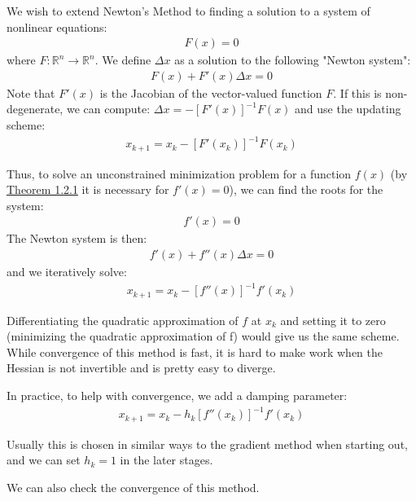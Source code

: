 \documentclass[12pt,a4paper]{article}
\begin{document}
	We wish to extend Newton's Method to finding a solution to a system of nonlinear equations:
	\begin{align*}
		F(x) = 0
	\end{align*}
	where $F: \mathbb{R}^n \rightarrow \mathbb{R}^n$. We define $\Delta x$ as a solution to the following "Newton system":
	\begin{align*}
		F(x) + F'(x)\Delta x = 0
	\end{align*}
	Note that $F'(x)$ is the Jacobian of the vector-valued function $F$. If this is non-degenerate, we can compute: $\Delta x = -[F'(x)]^{-1}F(x)$ and use the updating scheme:
	\begin{align*}
		x_{k+1} = x_k - [F'(x_k)]^{-1}F(x_k)
	\end{align*}
	
	Thus, to solve an unconstrained minimization problem for a function $f(x)$ (by \hyperref[thm121]{Theorem 1.2.1} it is necessary for $f'(x) = 0$), we can find the roots for the system:
	\begin{align*}
		f'(x) = 0
	\end{align*}
	The Newton system is then:
	\begin{align*}
		f'(x) + f''(x)\Delta x = 0
	\end{align*}
	and we iteratively solve:
	\begin{align*}
		x_{k+1} = x_k - [f''(x)]^{-1}f'(x_k)
	\end{align*}
	
	Differentiating the quadratic approximation of $f$ at $x_k$ and setting it to zero (minimizing the quadratic approximation of f) would give us the same scheme.
	While convergence of this method is fast, it is hard to make work when the Hessian is not invertible and is pretty easy to diverge. 
	
	In practice, to help with convergence, we add a damping parameter:
	\begin{align*}
		x_{k+1} = x_k - h_k[f''(x_k)]^{-1}f'(x_k)
	\end{align*}
	
	Usually this is chosen in similar ways to the gradient method when starting out, and we can set $h_k=1$ in the later stages.
	
	We can also check the convergence of this method.\\
\end{document}
